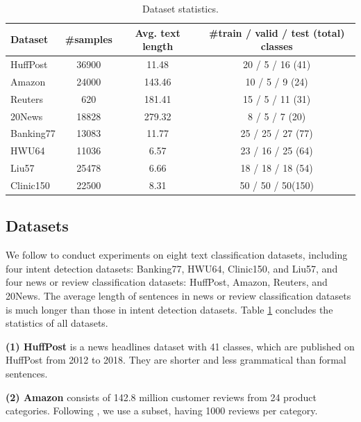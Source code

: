 \documentclass[letterpaper]{article} %
\begin{document}
\begin{table}[t]
	\centering
	\begin{tabular}{lccc}
		\toprule
		\textbf{Dataset} & \textbf{\#samples} & \textbf{Avg. text length} & \textbf{\#train / valid / test (total) classes} \\ \midrule
		HuffPost \cite{iclr/BaoWCB20}   & 36900             & 11.48           & 20 / 5 / 16 (41)      \\
		Amazon \cite{amazon}            & 24000             & 143.46          & 10 / 5 / 9 (24)       \\
		Reuters \cite{iclr/BaoWCB20}    & 620               & 181.41          & 15 / 5 / 11 (31)      \\
		20News \cite{20news}            & 18828             & 279.32          & 8 / 5 / 7 (20)        \\
\midrule
	    Banking77 \cite{banking}   & 13083             & 11.77        & 25 / 25 / 27 (77)          \\
		HWU64 \cite{hwu}           & 11036             & 6.57         & 23 / 16 / 25 (64)          \\
		Liu57 \cite{hwu}           & 25478             & 6.66         & 18 / 18 / 18 (54)          \\
		Clinic150 \cite{oos}       & 22500             & 8.31         & 50 / 50 / 50(150)          \\
	 \bottomrule
	\end{tabular}
	\caption{Dataset statistics.}
	\label{statistics}
\end{table}

\subsection{Datasets}
We follow \cite{ContrastNet} to conduct experiments on eight text classification datasets, including four intent detection datasets: Banking77, HWU64, Clinic150, and Liu57, and four news or review classification datasets: HuffPost, Amazon, Reuters, and 20News. The average length of sentences in news or review classification datasets is much longer than those in intent detection datasets. Table  \ref{statistics} concludes the statistics of all datasets.

\textbf{(1) HuffPost} \cite{iclr/BaoWCB20} is a news headlines dataset with 41 classes, which are published on HuffPost from 2012 to 2018. They are shorter and less grammatical than formal sentences.

\textbf{(2) Amazon} \cite{amazon} consists of 142.8 million customer reviews from 24 product categories. Following \cite{mlada}, we use a subset, having 1000 reviews per category.
\end{document}
